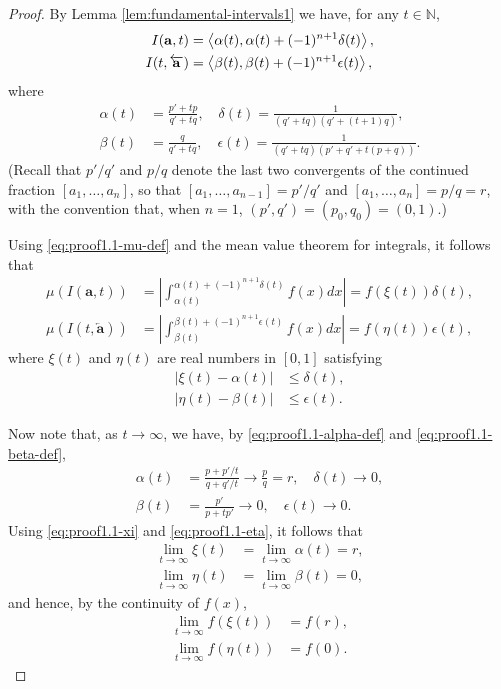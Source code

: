 \documentclass[10pt,a4paper]{amsart}
\newcommand{\Fundint}[1]{\left\langle #1\right\rangle}
\newcommand{\NN}{\mathbb{N}}
\newcommand{\bfar}{\overleftarrow{\bfa}}
\newcommand{\bfa}{\mathbf{a}}
\begin{document}
\begin{proof}
By Lemma \ref{lem:fundamental-intervals1} we have, for any
$t\in\NN$,
\begin{align}
\notag
I(\bfa,t) &= \Fundint{\alpha(t),\alpha(t)+(-1)^{n+1}\delta(t)},
\\
\notag
I(t,\bfar)&=\Fundint{\beta(t),\beta(t)+(-1)^{n+1}\epsilon(t)},
\end{align}
where 
\begin{align}
\label{eq:proof1.1-alpha-def}
\alpha(t)&=\frac{p'+tp}{q'+tq},
\quad \delta(t)=\frac1{(q'+tq)(q'+(t+1)q)},
\\
\label{eq:proof1.1-beta-def}
\beta(t)&=\frac{q}{q'+tq},
\quad \epsilon(t)=\frac1{(q'+tq)(p'+q'+t(p+q))}.
\end{align}
(Recall that $p'/q'$ and $p/q$ denote the last two convergents of the
continued fraction $[a_1,\dots,a_n]$, so that 
$[a_1,\dots,a_{n-1}]=p'/q'$ and $[a_1,\dots,a_n]=p/q=r$, 
with the convention that, when $n=1$,
$(p',q')=(p_0,q_0)=(0,1)$.)

Using \eqref{eq:proof1.1-mu-def} and the mean value theorem for
integrals, it follows
that
\begin{align}
\label{eq:proof1.1-muIbfat}
\mu(I(\bfa,t))&=\left|\int_{\alpha(t)}^{\alpha(t)+(-1)^{n+1}\delta(t)}
f(x)dx\right| =f(\xi(t))\delta(t),
\\
\label{eq:proof1.1-muItbfar}
\mu(I(t,\bfar))&=\left|\int_{\beta(t)}^{\beta(t)+(-1)^{n+1}\epsilon(t)}
f(x)dx\right| =f(\eta(t))\epsilon(t),
\end{align}
where $\xi(t)$ and $\eta(t)$ are real numbers in $[0,1]$ satisfying
\begin{align}
\label{eq:proof1.1-xi}
|\xi(t)-\alpha(t)|&\le \delta(t),
\\
\label{eq:proof1.1-eta}
|\eta(t)-\beta(t)|&\le \epsilon(t).
\end{align}

Now note that, as $t\to\infty$, we have, by 
\eqref{eq:proof1.1-alpha-def}
and \eqref{eq:proof1.1-beta-def}, 
\begin{align*}
\alpha(t)&= \frac{p+p'/t}{q+q'/t}\to \frac{p}{q}=r,
\quad \delta(t)\to 0,
\\
\beta(t)&=\frac{p'}{p+tp'}\to 0,
\quad \epsilon(t)\to 0.
\end{align*}
Using 
\eqref{eq:proof1.1-xi} and \eqref{eq:proof1.1-eta}, it follows that 
\begin{align*}
\lim_{t\to\infty}\xi(t)&=\lim_{t\to\infty}\alpha(t)=r,
\\
\lim_{t\to\infty}\eta(t)&=\lim_{t\to\infty}\beta(t)=0,
\end{align*}
and hence, by the continuity of $f(x)$,
\begin{align}
\label{eq:proof1.1-fxi-limit}
\lim_{t\to\infty}f(\xi(t))&=f(r),
\\
\label{eq:proof1.1-feta-limit}
\lim_{t\to\infty}f(\eta(t))&=f(0).
\end{align}


\end{proof}
\end{document}
